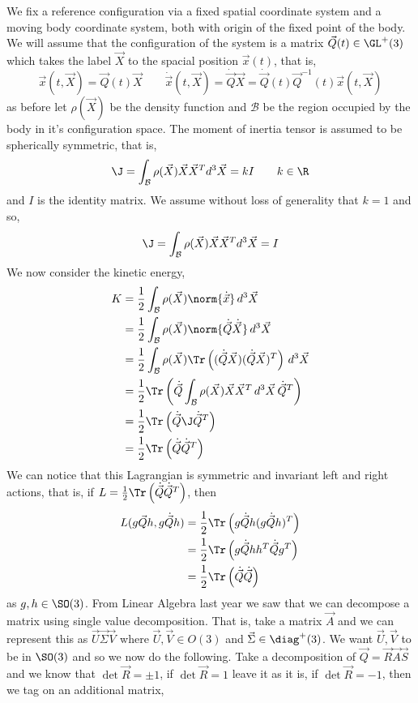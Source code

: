 \noindent
We fix a reference configuration via a fixed spatial coordinate system and a moving body coordinate system, both with origin of the fixed point of the body. We will assume that the configuration of the system is a matrix $\vec Q(t) \in \GL^+(3)$ which takes the label $\vec X$ to the spacial position $\vec x(t)$, that is,
$$ \vec x(t, \vec X) = \vec Q(t)\vec X \qquad \dot{\vec x}(t, \vec X) = \dot{\vec Q}\vec X = \dot{\vec Q}(t)\vec Q^{-1}(t)\vec x(t, \vec X) $$
as before let $\rho(\vec X)$ be the density function and $\mathcal{B}$ be the region occupied by the body in it's configuration space. The moment of inertia tensor is assumed to be spherically symmetric, that is,
$$ \J = \int_{\mathcal{B}} \rho(\vec X)\vec X\vec X^T d^3\vec X = kI \qquad k \in \R $$
and $I$ is the identity matrix. We assume without loss of generality that $k = 1$ and so,
$$ \J = \int_{\mathcal{B}} \rho(\vec X)\vec X\vec X^T d^3\vec X = I $$
We now consider the kinetic energy,
\begin{align*}
  K &= \frac{1}{2}\int_{\mathcal{B}} \rho(\vec X) \norm{\dot{\vec x}}\, d^3 \vec X \\
  &= \frac{1}{2}\int_{\mathcal{B}} \rho(\vec X) \norm{\dot{\vec Q}\dot{\vec X}}\, d^3 \vec X \\
  &= \frac{1}{2}\int_{\mathcal{B}} \rho(\vec X) \Tr\left( (\dot{\vec Q}\vec X)(\dot{\vec Q}\vec X)^T \right)\, d^3 \vec X \\
  &= \frac{1}{2}\Tr\left(\dot{\vec Q}\int_{\mathcal{B}} \rho(\vec X) \vec X\vec X^T \, d^3 \vec X\, \dot{\vec Q}^T \right)\\
  &= \frac{1}{2}\Tr\left( \dot{\vec Q}\J\dot{\vec Q}^T \right) \\
  &= \frac{1}{2}\Tr\left( \dot{\vec Q}\dot{\vec Q}^T \right)
\end{align*}
We can notice that this Lagrangian is symmetric and invariant left and right actions, that is, if $L = \frac{1}{2}\Tr\left(\dot{\vec Q}\dot{\vec Q}^T\right)$, then \begin{align*}
  L(g\vec{Q}h, g\dot{\vec Q}h) &= \frac{1}{2}\Tr\left( g\dot{\vec Q}h(g\dot{\vec Q}h)^T \right) \\
  &= \frac{1}{2}\Tr\left( g\dot{\vec Q}hh^T\dot{\vec Q}g^T \right) \\
  &= \frac{1}{2}\Tr\left( \dot{\vec Q}\dot{\vec Q} \right)
\end{align*}
as $g, h \in \SO(3)$.
From Linear Algebra last year we saw that we can decompose a matrix using single value decomposition. That is, take a matrix $\vec A$ and we can represent this as $\vec U\vec \Sigma \vec V$ where $\vec U, \vec V \in O(3)$ and $\vec\Sigma \in \diag^+(3)$. We want $\vec U, \vec V$ to be in $\SO(3)$ and so we now do the following. Take a decomposition of $\vec Q = \vec R\vec A\vec S$ and we know that $\det \vec R = \pm 1$, if $\det \vec R = 1$ leave it as it is, if $\det \vec R = -1$, then we tag on an additional matrix,
